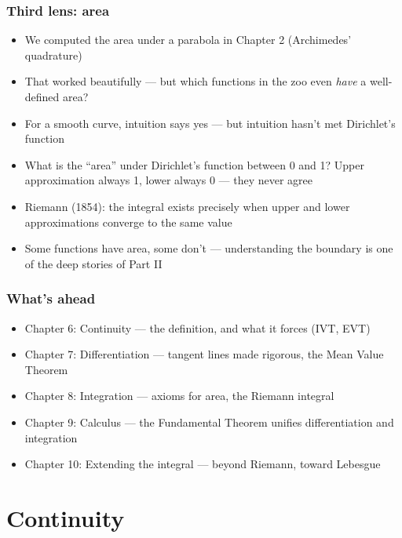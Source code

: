 \documentclass[
  10pt,
  letterpaper,
]{scrbook}
\providecommand{\tightlist}{%
  \setlength{\itemsep}{0pt}\setlength{\parskip}{0pt}}
\begin{document}
\subsection*{Third lens: area}\label{third-lens-area}

\begin{itemize}
\tightlist
\item
  We computed the area under a parabola in Chapter 2 (Archimedes'
  quadrature)
\item
  That worked beautifully --- but which functions in the zoo even
  \emph{have} a well-defined area?
\item
  For a smooth curve, intuition says yes --- but intuition hasn't met
  Dirichlet's function
\item
  What is the ``area'' under Dirichlet's function between 0 and 1? Upper
  approximation always 1, lower always 0 --- they never agree
\item
  Riemann (1854): the integral exists precisely when upper and lower
  approximations converge to the same value
\item
  Some functions have area, some don't --- understanding the boundary is
  one of the deep stories of Part II
\end{itemize}

\subsection*{What's ahead}\label{whats-ahead-1}

\begin{itemize}
\tightlist
\item
  Chapter 6: Continuity --- the definition, and what it forces (IVT,
  EVT)
\item
  Chapter 7: Differentiation --- tangent lines made rigorous, the Mean
  Value Theorem
\item
  Chapter 8: Integration --- axioms for area, the Riemann integral
\item
  Chapter 9: Calculus --- the Fundamental Theorem unifies
  differentiation and integration
\item
  Chapter 10: Extending the integral --- beyond Riemann, toward Lebesgue
\end{itemize}

\chapter{Continuity}\label{continuity}
\end{document}
